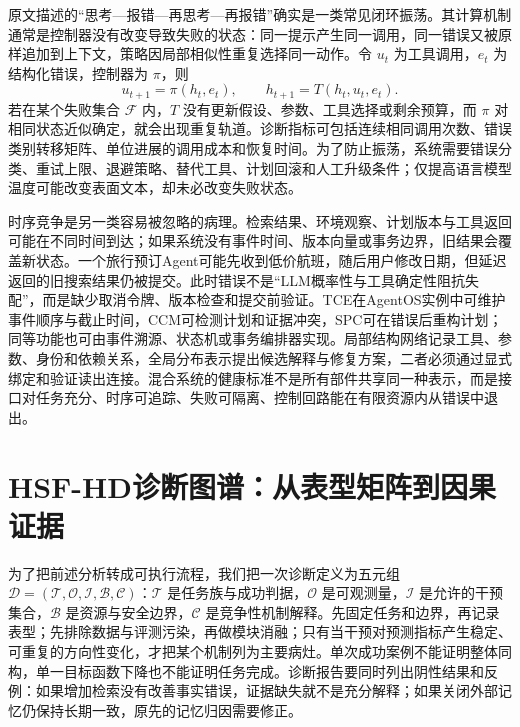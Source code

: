 原文描述的“思考—报错—再思考—再报错”确实是一类常见闭环振荡。其计算机制通常是控制器没有改变导致失败的状态：同一提示产生同一调用，同一错误又被原样追加到上下文，策略因局部相似性重复选择同一动作。令 \(u_t\) 为工具调用，\(e_t\) 为结构化错误，控制器为 \(\pi\)，则
\[
  u_{t+1}=\pi(h_t,e_t),\qquad
  h_{t+1}=T(h_t,u_t,e_t).
\]
若在某个失败集合 \(\mathcal F\) 内，\(T\) 没有更新假设、参数、工具选择或剩余预算，而 \(\pi\) 对相同状态近似确定，就会出现重复轨道。诊断指标可包括连续相同调用次数、错误类别转移矩阵、单位进展的调用成本和恢复时间。为了防止振荡，系统需要错误分类、重试上限、退避策略、替代工具、计划回滚和人工升级条件；仅提高语言模型温度可能改变表面文本，却未必改变失败状态。

时序竞争是另一类容易被忽略的病理。检索结果、环境观察、计划版本与工具返回可能在不同时间到达；如果系统没有事件时间、版本向量或事务边界，旧结果会覆盖新状态。一个旅行预订Agent可能先收到低价航班，随后用户修改日期，但延迟返回的旧搜索结果仍被提交。此时错误不是“LLM概率性与工具确定性阻抗失配”，而是缺少取消令牌、版本检查和提交前验证。TCE在AgentOS实例中可维护事件顺序与截止时间，CCM可检测计划和证据冲突，SPC可在错误后重构计划；同等功能也可由事件溯源、状态机或事务编排器实现。局部结构网络记录工具、参数、身份和依赖关系，全局分布表示提出候选解释与修复方案，二者必须通过显式绑定和验证读出连接。混合系统的健康标准不是所有部件共享同一种表示，而是接口对任务充分、时序可追踪、失败可隔离、控制回路能在有限资源内从错误中退出。

\section{HSF-HD诊断图谱：从表型矩阵到因果证据}
\label{sec:section_9482}

为了把前述分析转成可执行流程，我们把一次诊断定义为五元组 \(\mathcal D=(\mathcal T,\mathcal O,\mathcal I,\mathcal B,\mathcal C)\)：\(\mathcal T\) 是任务族与成功判据，\(\mathcal O\) 是可观测量，\(\mathcal I\) 是允许的干预集合，\(\mathcal B\) 是资源与安全边界，\(\mathcal C\) 是竞争性机制解释。先固定任务和边界，再记录表型；先排除数据与评测污染，再做模块消融；只有当干预对预测指标产生稳定、可重复的方向性变化，才把某个机制列为主要病灶。单次成功案例不能证明整体同构，单一目标函数下降也不能证明任务完成。诊断报告要同时列出阴性结果和反例：如果增加检索没有改善事实错误，证据缺失就不是充分解释；如果关闭外部记忆仍保持长期一致，原先的记忆归因需要修正。

